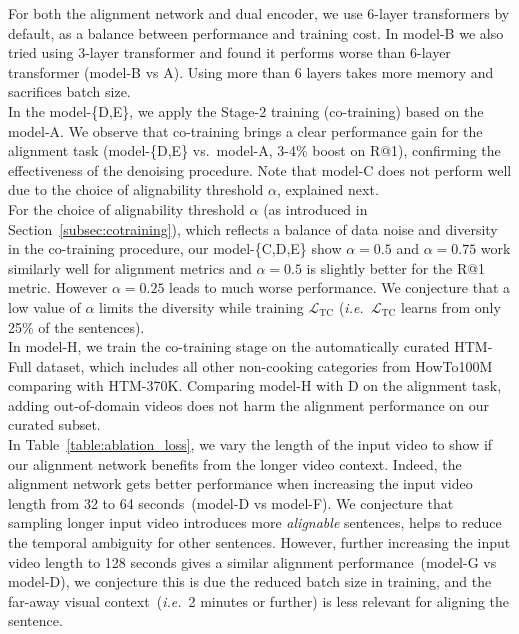 \vspace{-1mm}
For both the alignment network and dual encoder, we use 6-layer transformers by default, 
as a balance between performance and training cost.
In model-B we also tried using 3-layer transformer and found it performs worse than 6-layer transformer (model-B vs A).
Using more than 6 layers takes more memory and sacrifices batch size. \\[-9pt]

\vspace{-1mm}
In the model-\{D,E\}, we apply the Stage-2 training (co-training) based on the model-A.
We observe that co-training brings a clear performance gain for the alignment task (model-\{D,E\} vs.~model-A,
3-4\% boost on R@1), confirming the effectiveness of the denoising procedure.
Note that model-C does not perform well due to the choice of alignability threshold $\alpha$, explained next.
\\[-9pt]

\vspace{-4mm}
For the choice of alignability threshold $\alpha$ (as introduced in Section~\ref{subsec:cotraining}),
which reflects a balance of data noise and diversity in the co-training procedure,
our model-\{C,D,E\} show $\alpha=0.5$ and $\alpha=0.75$ work similarly well for alignment metrics and 
$\alpha=0.5$ is slightly better for the R@1 metric.
However $\alpha=0.25$ leads to much worse performance.
We conjecture that a low value of $\alpha$ limits the diversity while training $\mathcal{L}_{\text{TC}}$ 
({\em i.e.}~$\mathcal{L}_{\text{TC}}$ learns from only 25\% of the sentences).\\[-9pt]

\vspace{-1mm}
In model-H, we train the co-training stage on the automatically curated HTM-Full dataset, 
which includes all other non-cooking categories from HowTo100M comparing with HTM-370K. 
Comparing model-H with D on the alignment task,
 adding out-of-domain videos does not harm the alignment performance on our curated subset. \\[-9pt]

\vspace{-1mm}
In Table~\ref{table:ablation_loss}, 
we vary the length of the input video to show if our alignment network benefits from the longer video context.
Indeed, the alignment network gets better performance when increasing the input video length from 32 to 64 seconds~(model-D vs model-F). 
We conjecture that sampling longer input video introduces more \emph{alignable} sentences, 
helps to reduce the temporal ambiguity for other sentences.
However, further increasing the input video length to 128 seconds 
gives a similar alignment performance~(model-G vs model-D),
we conjecture this is due the reduced batch size in training,
and the far-away visual context~({\em i.e.}\ 2 minutes or further) is less relevant for aligning the sentence.

